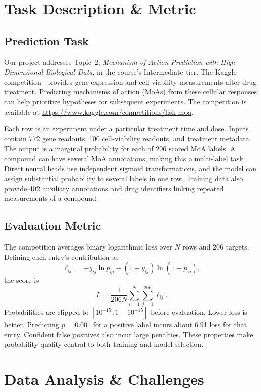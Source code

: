 \documentclass[journal]{IEEEtran}
\begin{document}
\section{Task Description \& Metric}
\label{sec:task}

\subsection{Prediction Task}
Our project addresses Topic~2, \emph{Mechanism of Action Prediction with High-Dimensional Biological Data}, in the course's Intermediate tier. The Kaggle competition~\cite{ref_kaggle} provides gene-expression and cell-viability measurements after drug treatment. Predicting mechanisms of action (MoAs) from these cellular responses can help prioritize hypotheses for subsequent experiments. The competition is available at \url{https://www.kaggle.com/competitions/lish-moa}.

Each row is an experiment under a particular treatment time and dose. Inputs contain 772 gene readouts, 100 cell-viability readouts, and treatment metadata. The output is a marginal probability for each of 206 scored MoA labels. A compound can have several MoA annotations, making this a multi-label task. Direct neural heads use independent sigmoid transformations, and the model can assign substantial probability to several labels in one row. Training data also provide 402 auxiliary annotations and drug identifiers linking repeated measurements of a compound.

\subsection{Evaluation Metric}
The competition averages binary logarithmic loss over $N$ rows and 206 targets. Defining each entry's contribution as
\begin{equation}
\ell_{ij}=-y_{ij}\ln p_{ij}-(1-y_{ij})\ln(1-p_{ij}),
\end{equation}
the score is
\begin{equation}
L=\frac{1}{206N}\sum_{i=1}^{N}\sum_{j=1}^{206}\ell_{ij}.
\label{eq:logloss}
\end{equation}
Probabilities are clipped to $[10^{-15},1-10^{-15}]$ before evaluation. Lower loss is better. Predicting $p=0.001$ for a positive label incurs about 6.91 loss for that entry. Confident false positives also incur large penalties. These properties make probability quality central to both training and model selection.

\section{Data Analysis \& Challenges}
\label{sec:data}
\end{document}
